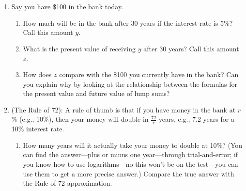 \begin{enumerate}


\item Say you have \$100 in the bank today.

    \begin{enumerate}

    \item How much will be in the bank after 30 years if the interest rate is 5\%? Call this amount $y$.


    \item What is the present value of receiving $y$ after 30 years? Call this amount $z$.


    \item How does $z$ compare with the \$100 you currently have in the bank? Can you explain why by looking at the relationship between the formulas for the present value and future value of lump sums?

    \end{enumerate}











\item (The Rule of 72): A rule of thumb is that if you have money in the bank at $r$\% (e.g., 10\%), then your money will double in $\displaystyle\frac{72}{r}$ years, e.g., 7.2 years for a 10\% interest rate.

    \begin{enumerate}

    \item How many years will it actually take your money to double at 10\%? (You can find the answer---plus or minus one year---through trial-and-error; if you know how to use logarithms---no this won't be on the test---you can use them to get a more precise answer.) Compare the true answer with the Rule of 72 approximation.



\end{enumerate}
\end{enumerate}
